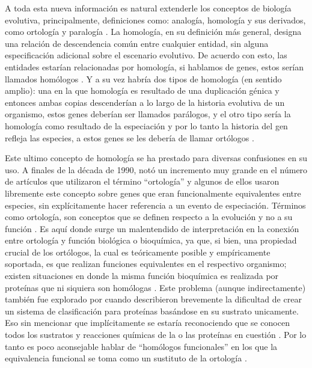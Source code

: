 A toda esta nueva información es natural extenderle los conceptos de biología evolutiva, principalmente, definiciones como: analogía, homología y sus derivados, como ortología y paralogía \parencite{Fitch_1970}. La homología, en su definición más general, designa una relación de descendencia común entre cualquier entidad, sin alguna especificación adicional sobre el escenario evolutivo. De acuerdo con esto, las entidades estarían relacionadas por homología, si hablamos de genes, estos serían llamados homólogos \parencite{Koonin_2005}. Y a su vez habría dos tipos de homología (en sentido amplio): una en la que homología es resultado de una duplicación génica y entonces ambas copias descenderían a lo largo de la historia evolutiva de un organismo, estos genes deberían ser llamados parálogos, y el otro tipo sería la homología como resultado de la especiación y por lo tanto la historia del gen refleja las especies, a estos genes se les debería de llamar ortólogos \parencite{Fitch_1970}.
 
Este ultimo concepto de homología se ha prestado para diversas confusiones en su uso. A finales de la década de 1990, \textcite{Ouzounis_1999} notó un incremento muy grande en el número de artículos que utilizaron el término ``ortología'' y algunos de ellos usaron libremente este concepto sobre genes que eran funcionalmente equivalentes entre especies, sin explícitamente hacer referencia a un evento de especiación. Términos como ortología, son conceptos que se definen respecto a la evolución y no a su función \parencite{Webber_2004}. Es aquí donde surge un malentendido de interpretación en la conexión entre ortología y función biológica o bioquímica, ya que, si bien, una propiedad crucial de los ortólogos, la cual es teóricamente posible y empíricamente soportada, es que realizan funciones equivalentes en el respectivo organismo; existen situaciones en donde la misma función bioquímica es realizada por proteínas que ni siquiera son homólogas \parencite{Koonin_2005}. Este problema (aunque indirectamente) también fue explorado por \textcite{Henrissat_1997} cuando describieron brevemente la dificultad de crear un sistema de clasificación para proteínas basándose en su sustrato unicamente. Eso sin mencionar que implícitamente se estaría reconociendo que se conocen todos los sustratos y reacciones químicas de la o las proteínas en cuestión \parencite{Petsko_2001}. Por lo tanto es poco aconsejable hablar de ``homólogos funcionales'' en los que la equivalencia funcional se toma como un sustituto de la ortología \parencite{Koonin_2005}. 

